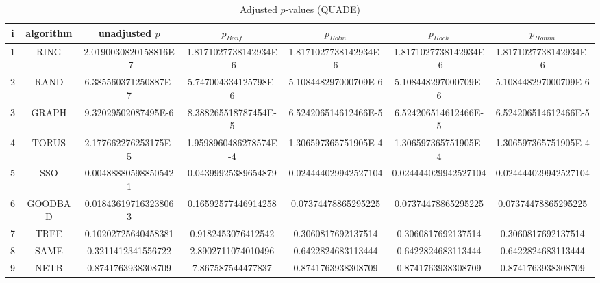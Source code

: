 \documentclass[a4paper,10pt]{article}
\begin{document}
\begin{landscape}
\begin{table}[!htp]
\centering\scriptsize
\caption{Adjusted $p$-values (QUADE)}
\begin{tabular}{ccccccc}
i&algorithm&unadjusted $p$&$p_{Bonf}$&$p_{Holm}$&$p_{Hoch}$&$p_{Homm}$\\
\hline
1& RING&2.0190030820158816E-7&1.8171027738142934E-6&1.8171027738142934E-6&1.8171027738142934E-6&1.8171027738142934E-6\\
2& RAND&6.385560371250887E-7&5.747004334125798E-6&5.108448297000709E-6&5.108448297000709E-6&5.108448297000709E-6\\
3& GRAPH&9.32029502087495E-6&8.388265518787454E-5&6.524206514612466E-5&6.524206514612466E-5&6.524206514612466E-5\\
4& TORUS&2.177662276253175E-5&1.9598960486278574E-4&1.306597365751905E-4&1.306597365751905E-4&1.306597365751905E-4\\
5& SSO&0.004888805988505421&0.04399925389654879&0.024444029942527104&0.024444029942527104&0.024444029942527104\\
6& GOODBAD&0.018436197163238063&0.16592577446914258&0.07374478865295225&0.07374478865295225&0.07374478865295225\\
7& TREE&0.10202725640458381&0.9182453076412542&0.3060817692137514&0.3060817692137514&0.3060817692137514\\
8& SAME&0.3211412341556722&2.8902711074010496&0.6422824683113444&0.6422824683113444&0.6422824683113444\\
9& NETB&0.8741763938308709&7.867587544477837&0.8741763938308709&0.8741763938308709&0.8741763938308709\\
\hline
\end{tabular}
\end{table}


\end{landscape}
\end{document}
